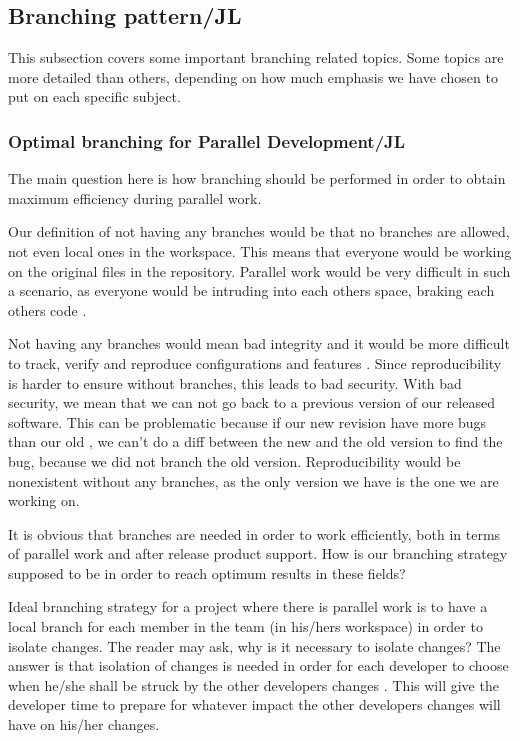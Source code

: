\documentclass[10pt]{article}
\begin{document}
\subsection{Branching pattern/JL}
This subsection covers some important branching related topics. Some topics are more detailed than others, depending on how much emphasis we have chosen to put on each specific subject.

\subsubsection{Optimal branching for Parallel Development/JL}
The main question here is how branching should be performed in order to obtain maximum efficiency during parallel work. 

\noindent Our definition of not having any branches would be that no branches are allowed, not even local ones in the workspace. This means that everyone would be working on the original files in the repository. Parallel work would be very difficult in such a scenario, as everyone would be intruding into each others space, braking each others code \cite{Appleton}.

\noindent Not having any branches would mean bad integrity and it would be more difficult to track, verify and reproduce configurations and features \cite{Appleton}. Since reproducibility is harder to ensure without branches, this leads to bad security. With bad security, we mean that we can not go back to a previous version of our released software. This can be problematic because if our new revision have more bugs than our old \cite{Babich}, we can't do a diff between the new and the old version to find the bug, because we did not branch the old version. Reproducibility would be nonexistent without any branches, as the only version we have is the one we are working on.

\noindent It is obvious that branches are needed in order to work efficiently, both in terms of parallel work and after release product support. How is our branching strategy supposed to be in order to reach optimum results in these fields?

\noindent Ideal branching strategy for a project where there is parallel work is to have a local branch for each member in the team (in his/hers workspace) in order to isolate changes. The reader may ask, why is it necessary to isolate changes? The answer is that isolation of changes is needed in order for each developer to choose when he/she shall be struck by the other developers changes \cite{Appleton}. This will give the developer time to prepare for whatever impact the other developers changes will have on his/her changes.
\end{document}
